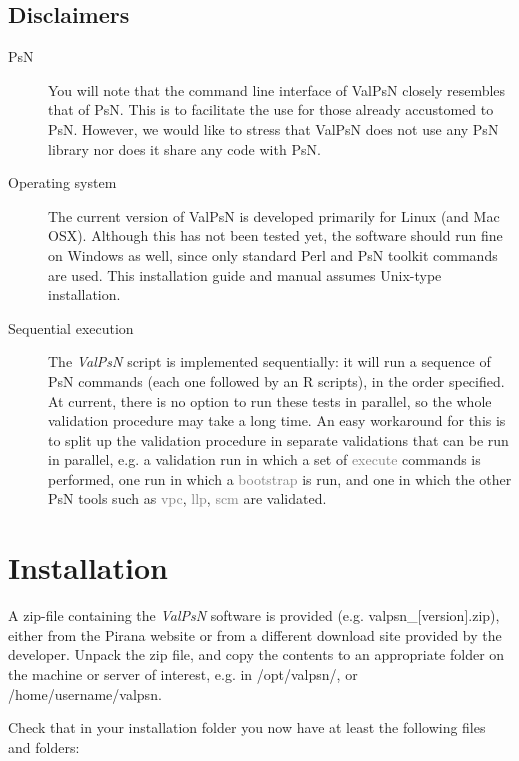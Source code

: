 \documentclass[a4,11pt]{report} \usepackage[pdftex]{graphicx}
\newcommand{\ValPsN}{\textcolor{PiranaOrange}{\textit{ValPsN}}\xspace}
\newcommand{\psn}[1]{\textcolor{Grey}{#1}}
\begin{document}
\section{Disclaimers}
\begin{description}
\item[PsN] You will note that the command line interface of ValPsN
  closely resembles that of PsN. This is to facilitate the use for
  those already accustomed to PsN. However, we would like to stress
  that ValPsN does not use any PsN library nor does it share any code
  with PsN.

\item[Operating system] The current version of ValPsN is developed
  primarily for Linux (and Mac OSX). Although this has not been tested
  yet, the software should run fine on Windows as well, since only
  standard Perl and PsN toolkit commands are used. This installation
  guide and manual assumes Unix-type installation.

\item[Sequential execution] The \ValPsN script is implemented
  sequentially: it will run a sequence of PsN commands (each one
  followed by an R scripts), in the order specified. At current, there
  is no option to run these tests in parallel, so the whole validation
  procedure may take a long time. An easy workaround for this is to
  split up the validation procedure in separate validations that
  can be run in parallel, e.g. a validation run in which a set of
  \psn{execute} commands is performed, one run in which a
  \psn{bootstrap} is run, and one in which the other PsN tools such as
  \psn{vpc}, \psn{llp}, \psn{scm} are validated.

\end{description}

\chapter{Installation}

A zip-file containing the \ValPsN software is provided
(e.g. valpsn\_[version].zip), either from the Pirana website or from a
different download site provided by the developer. Unpack the zip file,
and copy the contents to an appropriate folder on the machine or
server of interest, e.g. in /opt/valpsn/, or /home/username/valpsn.

\vspace{10pt}
\noindent Check that in your installation folder you now have at
least the following files and folders:
\end{document}
